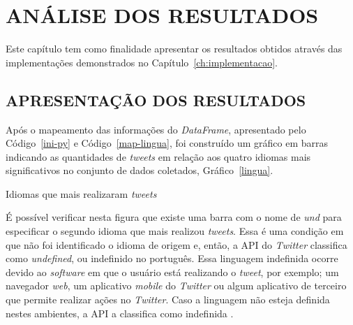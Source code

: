 \chapter{ANÁLISE DOS RESULTADOS}\label{ch:conclusao}

Este capítulo tem como finalidade apresentar os resultados obtidos através das implementações demonstrados no Capítulo~\ref{ch:implementacao}.

\section{APRESENTAÇÃO DOS RESULTADOS}

Após o mapeamento das informações do \textit{DataFrame}, apresentado pelo Código~\ref{ini-py} e Código~\ref{map-lingua}, foi construído um gráfico em barras indicando as quantidades de \textit{tweets} em relação aos quatro idiomas mais significativos no conjunto de dados coletados, Gráfico~\ref{lingua}.

\begin{grafico}[h!]
	\centering
	\vspace{-0.2cm}
	\caption{Idiomas que mais realizaram \textit{tweets}}
	\label{lingua}
\end{grafico}

É possível verificar nesta figura que existe uma barra com o nome de \textit{und} para especificar o segundo idioma que mais realizou \textit{tweets}. Essa é uma condição em que não foi identificado o idioma de origem e, então, a API do \textit{Twitter} classifica como \textit{undefined}, ou indefinido no português. Essa linguagem indefinida ocorre devido ao \textit{software} em que o usuário está realizando o \textit{tweet}, por exemplo; um navegador \textit{web}, um aplicativo \textit{mobile} do \textit{Twitter} ou algum aplicativo de terceiro que permite realizar ações no \textit{Twitter}. Caso a linguagem não esteja definida nestes ambientes, a API a classifica como indefinida \cite{twitter-doc}.

